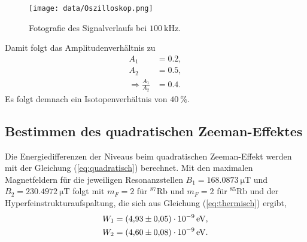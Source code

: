 \begin{figure}[H]
    \centering
    \texttt{[image: data/Oszilloskop.png]}
    \caption{Fotografie des Signalverlaufs bei $\SI{100}{\kilo\hertz}$.}
    \label{fig:Oszilloskop}
\end{figure}

Damit folgt das Amplitudenverhältnis zu
\begin{align*}
    A_1 &= 0.2, \\
    A_2 &= 0.5, \\
    \Rightarrow \frac{A_1}{A_2} &= 0.4.
\end{align*}
Es folgt demnach ein Isotopenverhältnis von $\SI{40}{\percent}$.

\subsection{Bestimmen des quadratischen Zeeman-Effektes}
\label{subsec:quadrZeeman}

Die Energiedifferenzen der Niveaus beim quadratischen Zeeman-Effekt werden mit der Gleichung (\ref{eq:quadratisch}) berechnet.
Mit den maximalen Magnetfeldern für die jeweiligen Resonanzstellen $B_1 = \SI{168.0873}{\micro\tesla}$ und $B_2 = \SI{230.4972}{\micro\tesla}$ folgt mit $m_F=2$ für $^{87}\text{Rb}$
und $m_F = 2$ für $^{85}\text{Rb}$ und der Hyperfeinstrukturaufspaltung, die sich aus Gleichung (\ref{eq:thermisch}) ergibt,
\begin{align*}
    W_1 &= \SI{4.93 \pm 0.05 e-09}{\eV}, \\
    W_2 &= \SI{4.60 \pm 0.08 e-09}{\eV}.
\end{align*}